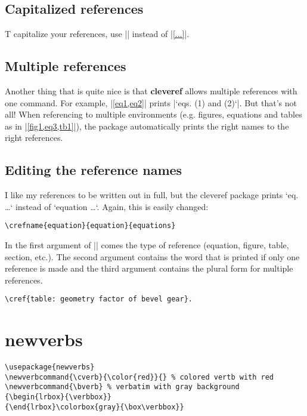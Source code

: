 \subsection{Capitalized references}
T capitalize your references, use \cverb|| instead of \cverb|\cref{...}|.

\subsection{Multiple references}
Another thing that is quite nice is that \textbf{cleveref} allows multiple references with one command. For example, \cverb|\cref{eq1,eq2}| prints \cverb|‘eqs. (1) and (2)‘|. But that’s not all! When referencing to multiple environments (e.g. figures, equations and tables as in \cverb|\cref{fig1,eq3,tb1}|), the package automatically prints the right names to the right references.

\subsection{Editing the reference names}
I like my references to be written out in full, but the cleveref package prints ‘eq. …‘ instead of ‘equation …‘. Again, this is easily changed:

\begin{lstlisting}[language={[LaTeX]TeX}]
\crefname{equation}{equation}{equations}
\end{lstlisting}

In the first argument of \cverb|\crefname{}{}{}| comes the type of reference (equation, figure, table, section, etc.). The second argument contains the word that is printed if only one reference is made and the third argument contains the plural form for multiple references.

\begin{lstlisting}[language={[LaTeX]TeX}]
\cref{table: geometry factor of bevel gear}.
\end{lstlisting}


\section{newverbs}
\begin{lstlisting}[language={[LaTeX]TeX}]
\usepackage{newverbs}
\newverbcommand{\cverb}{\color{red}}{} % colored vertb with red
\newverbcommand{\bverb}	% verbatim with gray background
{\begin{lrbox}{\verbbox}}
{\end{lrbox}\colorbox{gray}{\box\verbbox}}
\end{lstlisting}

